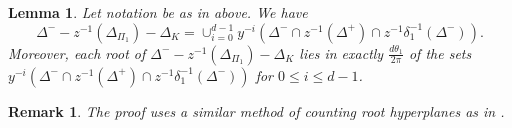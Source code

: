 \documentclass[12pt,leqno]{article}
\newtheorem{lemma}[equation]{Lemma}
\newtheorem{remark}[equation]{Remark}
{\theorembodyfont{\rmfamily}
\newtheorem{theoremplain}[equation]{Theorem}
\newtheorem{remarkplain}[equation]{Remark}
\newtheorem{editorialremarkplain}[equation]{Editorial Remark}
\newtheorem{exampleplain}[equation]{Example}
\newtheorem{corollaryplain}[equation]{Corollary}
}
\def\le{\leqslant}
\def\d{\delta}
\def\D{\Delta}
\def\th{\theta}
\def\i{^{-1}}
\begin{document}
\begin{lemma} \label{tech}
	Let notation be as in above. We have $$\D^- - z \i(\D_{\Pi_1})-\D_K = \cup_{i=0}^{d-1} y^{-i}(\D^- \cap z \i(\D^+) \cap z \i \d_1 \i(\D^-)).$$ Moreover, each root of $\D^- - z \i(\D_{\Pi_1})-\D_K$ lies in exactly $\frac{d \th_1} {2\pi}$ of the sets $y^{-i}(\D^- \cap z \i(\D^+) \cap z \i \d_1 \i(\D^-))$ for $0 \le i \le d-1$.
	
\end{lemma}
\begin{remark}
The proof uses a similar method of counting root hyperplanes as in \cite[Lemma 2.1]{he_nie_minimal_finite}.
\end{remark}
\end{document}
